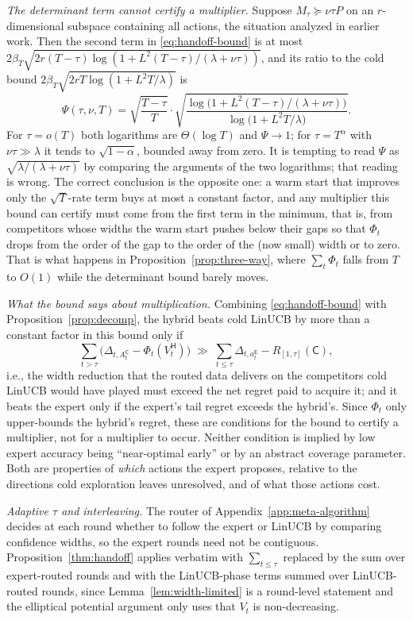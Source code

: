 \documentclass{article}
\theoremstyle{definition}
\theoremstyle{remark}
\theoremstyle{remark}
\newcommand{\Cold}{\mathsf{C}}
\newcommand{\Exp}{\mathsf{E}}
\newcommand{\Hyb}{\mathsf{H}}
\begin{document}
\emph{The determinant term cannot certify a multiplier.} Suppose
$M_\tau\succeq\nu\tau P$ on an $r$-dimensional subspace containing all actions,
the situation analyzed in earlier work. Then the second term in
\eqref{eq:handoff-bound} is at most
$2\beta_T\sqrt{2r(T-\tau)\log(1+L^2(T-\tau)/(\lambda+\nu\tau))}$, and its ratio
to the cold bound $2\beta_T\sqrt{2rT\log(1+L^2T/\lambda)}$ is
\[
\Psi(\tau,\nu,T)=\sqrt{\frac{T-\tau}{T}}\cdot\sqrt{\frac{\log\bigl(1+L^2(T-\tau)/(\lambda+\nu\tau)\bigr)}{\log\bigl(1+L^2T/\lambda\bigr)}}.
\]
For $\tau=o(T)$ both logarithms are $\Theta(\log T)$ and $\Psi\to1$; for
$\tau=T^{\alpha}$ with $\nu\tau\gg\lambda$ it tends to $\sqrt{1-\alpha}$, bounded
away from zero. It is tempting to read $\Psi$ as
$\sqrt{\lambda/(\lambda+\nu\tau)}$ by comparing the arguments of the two
logarithms; that reading is wrong. The correct conclusion is the opposite
one: a warm start that improves only the $\sqrt{T}$-rate term buys at most a
constant factor, and any multiplier this bound can certify must come from the first term in the
minimum, that is, from competitors whose widths the warm start pushes below
their gaps so that $\Phi_t$ drops from the order of the gap to the order of
the (now small) width or to zero. That is what happens in
Proposition~\ref{prop:three-way}, where $\sum_t\Phi_t$ falls from $T$ to $O(1)$
while the determinant bound barely moves.

\emph{What the bound says about multiplication.} Combining
\eqref{eq:handoff-bound} with Proposition~\ref{prop:decomp}, the hybrid beats
cold LinUCB by more than a constant factor in this bound only if
\[
\sum_{t>\tau}\bigl(\Delta_{t,A^{\Cold}_t}-\Phi_t(V^{\Hyb}_t)\bigr)
\;\gg\;
\sum_{t\le\tau}\Delta_{t,a_t^{\Exp}}-R_{[1,\tau]}(\Cold),
\]
i.e., the width reduction that the routed data delivers on the competitors
cold LinUCB would have played must exceed the net regret paid to acquire it;
and it beats the expert only if the expert's tail regret exceeds the hybrid's.
Since $\Phi_t$ only upper-bounds the hybrid's regret, these are conditions for
the bound to certify a multiplier, not for a multiplier to occur.
Neither condition is implied by low expert accuracy being ``near-optimal
early'' or by an abstract coverage parameter. Both are properties of
\emph{which} actions the expert proposes, relative to the directions cold
exploration leaves unresolved, and of what those actions cost.

\emph{Adaptive $\tau$ and interleaving.} The router of
Appendix~\ref{app:meta-algorithm} decides at each round whether to follow the
expert or LinUCB by comparing confidence widths, so the expert rounds need not
be contiguous. Proposition~\ref{thm:handoff} applies verbatim with
$\sum_{t\le\tau}$ replaced by the sum over expert-routed rounds and with the
LinUCB-phase terms summed over LinUCB-routed rounds, since
Lemma~\ref{lem:width-limited} is a round-level statement and the elliptical
potential argument only uses that $V_t$ is non-decreasing.
\end{document}
